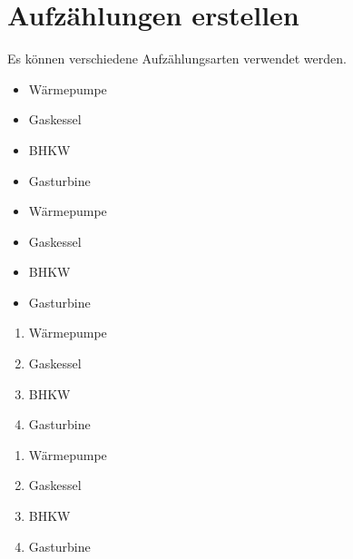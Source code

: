\section{Aufzählungen erstellen}
Es können verschiedene Aufzählungsarten verwendet werden.
\begin{itemize}[noitemsep]
	\item Wärmepumpe
	\item Gaskessel 
	\item BHKW
	\item Gasturbine
\end{itemize}

\begin{itemize}[noitemsep]
	\item [] Wärmepumpe
	\item [] Gaskessel 
	\item [] BHKW
	\item [] Gasturbine
\end{itemize}



\begin{enumerate}[noitemsep]
	\item Wärmepumpe
	\item Gaskessel 
	\item BHKW
	\item Gasturbine
\end{enumerate}

\begin{enumerate}[noitemsep, label=\alph*]
	\item Wärmepumpe
	\item Gaskessel 
	\item BHKW
	\item Gasturbine
\end{enumerate}





